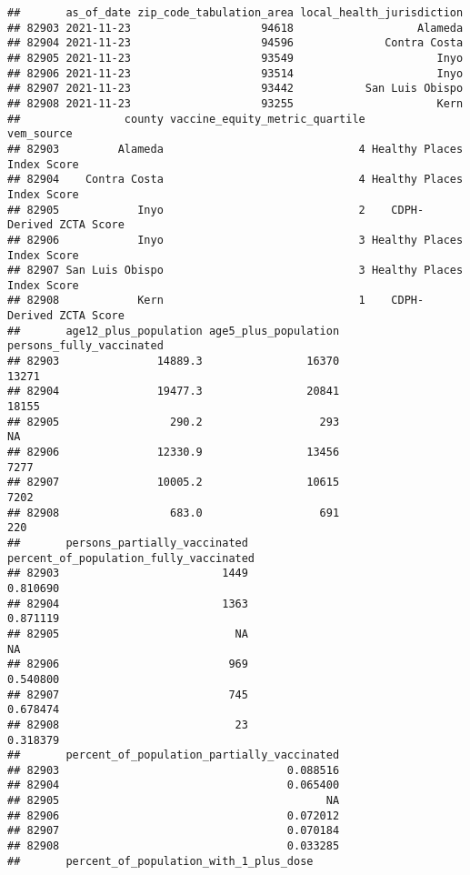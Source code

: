 \documentclass[
]{article}
\begin{document}
\begin{verbatim}
##       as_of_date zip_code_tabulation_area local_health_jurisdiction
## 82903 2021-11-23                    94618                   Alameda
## 82904 2021-11-23                    94596              Contra Costa
## 82905 2021-11-23                    93549                      Inyo
## 82906 2021-11-23                    93514                      Inyo
## 82907 2021-11-23                    93442           San Luis Obispo
## 82908 2021-11-23                    93255                      Kern
##                county vaccine_equity_metric_quartile                 vem_source
## 82903         Alameda                              4 Healthy Places Index Score
## 82904    Contra Costa                              4 Healthy Places Index Score
## 82905            Inyo                              2    CDPH-Derived ZCTA Score
## 82906            Inyo                              3 Healthy Places Index Score
## 82907 San Luis Obispo                              3 Healthy Places Index Score
## 82908            Kern                              1    CDPH-Derived ZCTA Score
##       age12_plus_population age5_plus_population persons_fully_vaccinated
## 82903               14889.3                16370                    13271
## 82904               19477.3                20841                    18155
## 82905                 290.2                  293                       NA
## 82906               12330.9                13456                     7277
## 82907               10005.2                10615                     7202
## 82908                 683.0                  691                      220
##       persons_partially_vaccinated percent_of_population_fully_vaccinated
## 82903                         1449                               0.810690
## 82904                         1363                               0.871119
## 82905                           NA                                     NA
## 82906                          969                               0.540800
## 82907                          745                               0.678474
## 82908                           23                               0.318379
##       percent_of_population_partially_vaccinated
## 82903                                   0.088516
## 82904                                   0.065400
## 82905                                         NA
## 82906                                   0.072012
## 82907                                   0.070184
## 82908                                   0.033285
##       percent_of_population_with_1_plus_dose

\end{verbatim}
\end{document}
